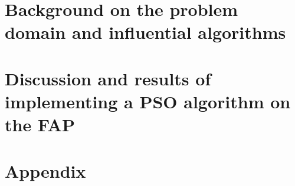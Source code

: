 \documentclass[11pt,a4paper,oneside]{book}
\begin{document}
\frontmatter
\makecover

\tableofcontents
\listoffigures
\listofalgorithms
\listoftables
\mainmatter
\part{Background on the problem domain and influential algorithms}
\part{Discussion and results of implementing a PSO algorithm on the FAP}
\backmatter


\part{Appendix}

\printglossaries
\end{document}
